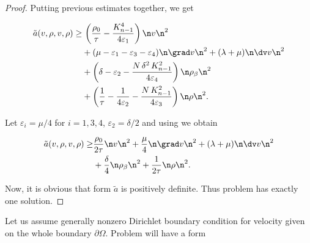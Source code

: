 \begin{proof}
Putting previous estimates together, we get

\[
\begin{split}
\tilde a(v,\rho,v,\rho) \geq
&\, \left( \frac{\rho_0}{\tau}-\frac{K_{n-1}^4}{4\varepsilon_1} \right) \n v\n^2\\ 
&+(\mu-\varepsilon_1-\varepsilon_3-\varepsilon_4)\n\grad v\n^2 
+(\lambda+\mu)\n\dv v\n^2 \\
&+\left(\delta-\varepsilon_2-\frac{N\,\delta^2\,K_{n-1}^2}{4\varepsilon_4}\right)\n\rho_\beta\n^2\\
&+\left(\frac{1}{\tau}-\frac{1}{4\varepsilon_2}-\frac{N\,K_{n-1}^2}{4\varepsilon_3}\right)\n\rho\n^2.
\end{split}
\] 

Let $\varepsilon_i=\mu/4$ for $i=1,3,4$, $\varepsilon_2=\delta/2$ and
using  we obtain

\[
\begin{split}
\tilde a(v,\rho,v,\rho) \geq
&\frac{\rho_0}{2\tau}\n v\n^2 +\frac{\mu}{4}\n\grad v\n^2+(\lambda+\mu)\n\dv v\n^2 \\ 
&+\frac{\delta}{4}\n\rho_\beta\n^2 + \frac{1}{2\tau}\n\rho\n^2.
\end{split}
\] 

Now, it is obvious that form $\tilde a$ is positively definite. Thus problem
 has exactly one solution. 

\end{proof}


Let us assume generally nonzero Dirichlet boundary condition for velocity given on the whole boundary $\partial \Omega$. 
Problem  will have a form


